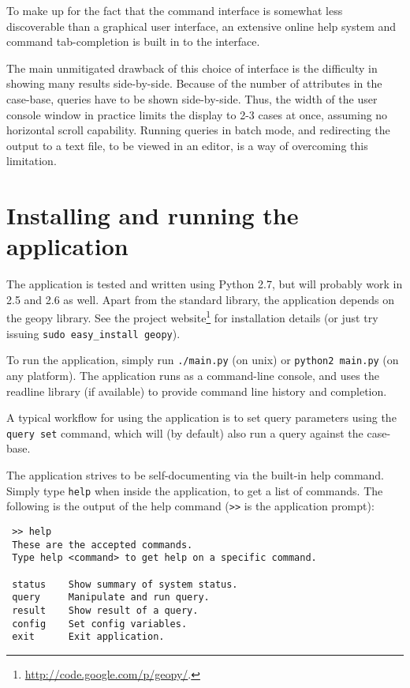 \documentclass[a4paper,11pt]{scrartcl}
\begin{document}
To make up for the fact that the command interface is somewhat less
discoverable than a graphical user interface, an extensive online help
system and command tab-completion is built in to the interface.

The main unmitigated drawback of this choice of interface is the
difficulty in showing many results side-by-side. Because of the number
of attributes in the case-base, queries have to be shown side-by-side.
Thus, the width of the user console window in practice limits the
display to 2-3 cases at once, assuming no horizontal scroll
capability. Running queries in batch mode, and redirecting the output
to a text file, to be viewed in an editor, is a way of overcoming this
limitation.

\clearpage
\section{Installing and running the application}
The application is tested and written using Python 2.7, but will
probably work in 2.5 and 2.6 as well. Apart from the standard library,
the application depends on the geopy library. See the project
website\footnote{\url{http://code.google.com/p/geopy/}.} for
installation details (or just try issuing \texttt{sudo easy\_install
  geopy}).

To run the application, simply run \texttt{./main.py} (on unix) or
\texttt{python2 main.py} (on any platform). The application runs as a
command-line console, and uses the readline library (if available) to
provide command line history and completion.

A typical workflow for using the application is to set query
parameters using the \verb~query set~ command, which will (by default)
also run a query against the case-base.

The application strives to be self-documenting via the built-in help
command. Simply type \verb~help~ when inside the application, to get a
list of commands. The following is the output of the help command (\verb~>>~
is the application prompt):

\small
\begin{verbatim}
 >> help
 These are the accepted commands.
 Type help <command> to get help on a specific command.

 status    Show summary of system status.
 query     Manipulate and run query.
 result    Show result of a query.
 config    Set config variables.
 exit      Exit application.
\end{verbatim}
\end{document}
